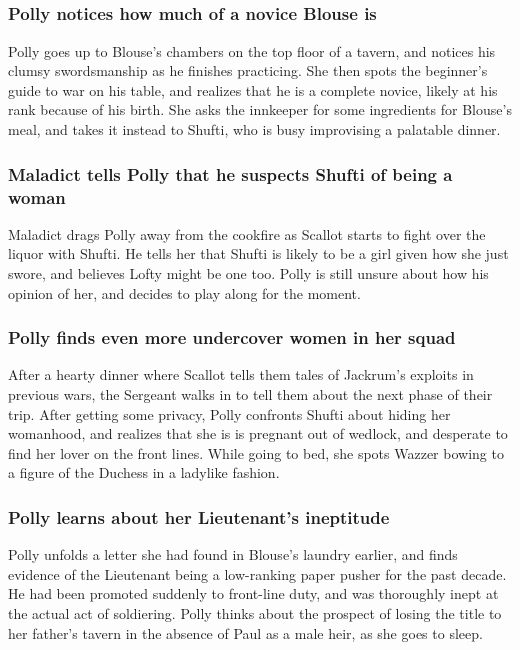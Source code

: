 \subsection{}
\subsubsection{\Gls{Polly} notices how much of a novice \Gls{Blouse} is}
\Gls{Polly} goes up to \Gls{Blouse}'s chambers on the top floor of a tavern, and notices his
clumsy swordsmanship as he finishes practicing. She then spots the beginner's guide to war on his
table, and realizes that he is a complete novice, likely at his rank because of his birth. She asks
the innkeeper for some ingredients for \Gls{Blouse}'s meal, and takes it instead to \Gls{Shufti},
who is busy improvising a palatable dinner.

\subsubsection{\Gls{Maladict} tells \Gls{Polly} that he suspects \Gls{Shufti} of being a woman}
\Gls{Maladict} drags \Gls{Polly} away from the cookfire as \Gls{Scallot} starts to fight over the
liquor with \Gls{Shufti}. He tells her that \Gls{Shufti} is likely to be a girl given how she just
swore, and believes \Gls{Lofty} might be one too. \Gls{Polly} is still unsure about how his opinion
of her, and decides to play along for the moment.

\subsubsection{\Gls{Polly} finds even more undercover women in her squad}
After a hearty dinner where \Gls{Scallot} tells them tales of \Gls{Jackrum}'s exploits in previous
wars, the Sergeant walks in to tell them about the next phase of their trip. After getting some
privacy, \Gls{Polly} confronts \Gls{Shufti} about hiding her womanhood, and realizes that she is
is pregnant out of wedlock, and desperate to find her lover on the front lines. While going to bed,
she spots \Gls{Wazzer} bowing to a figure of the \Gls{Duchess} in a ladylike fashion.

\subsubsection{\Gls{Polly} learns about her Lieutenant's ineptitude}
\Gls{Polly} unfolds a letter she had found in \Gls{Blouse}'s laundry earlier, and finds evidence of
the Lieutenant being a low-ranking paper pusher for the past decade. He had been promoted suddenly
to front-line duty, and was thoroughly inept at the actual act of soldiering. \Gls{Polly} thinks
about the prospect of losing the title to her father's tavern in the absence of \Gls{Paul} as a male
heir, as she goes to sleep.

